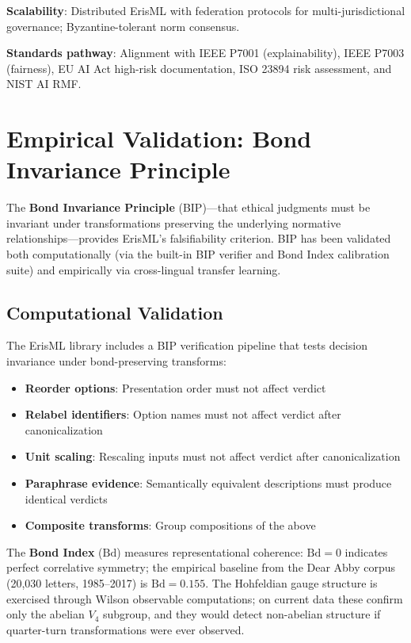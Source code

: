 \documentclass[conference]{IEEEtran}
\begin{document}
\textbf{Scalability}: Distributed ErisML with federation protocols for multi-jurisdictional governance; Byzantine-tolerant norm consensus.

\textbf{Standards pathway}: Alignment with IEEE P7001 (explainability), IEEE P7003 (fairness), EU AI Act high-risk documentation, ISO 23894 risk assessment, and NIST AI RMF.

\section{Empirical Validation: Bond Invariance Principle}
\label{sec:empirical}

The \textbf{Bond Invariance Principle} (BIP)---that ethical judgments must be invariant under transformations preserving the underlying normative relationships---provides ErisML's falsifiability criterion. BIP has been validated both computationally (via the built-in BIP verifier and Bond Index calibration suite) and empirically via cross-lingual transfer learning.

\subsection{Computational Validation}

The ErisML library includes a BIP verification pipeline that tests decision invariance under bond-preserving transforms:

\begin{itemize}
\item \textbf{Reorder options}: Presentation order must not affect verdict
\item \textbf{Relabel identifiers}: Option names must not affect verdict after canonicalization
\item \textbf{Unit scaling}: Rescaling inputs must not affect verdict after canonicalization
\item \textbf{Paraphrase evidence}: Semantically equivalent descriptions must produce identical verdicts
\item \textbf{Composite transforms}: Group compositions of the above
\end{itemize}

The \textbf{Bond Index} ($\mathrm{Bd}$) measures representational coherence: $\mathrm{Bd} = 0$ indicates perfect correlative symmetry; the empirical baseline from the Dear Abby corpus (20,030 letters, 1985--2017) is $\mathrm{Bd} = 0.155$. The Hohfeldian gauge structure is exercised through Wilson observable computations; on current data these confirm only the abelian $V_4$ subgroup, and they would detect non-abelian structure if quarter-turn transformations were ever observed.
\end{document}
